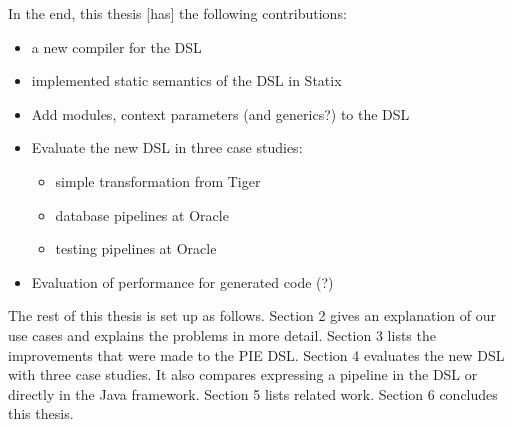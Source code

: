 In the end, this thesis [has]  the following contributions:
\begin{itemize}
  \item a new compiler for the DSL
  \item implemented static semantics of the \ac{DSL} in Statix
  \item Add modules, context parameters (and generics?) to the DSL
  \item Evaluate the new \ac{DSL} in three case studies:
  \begin{itemize}
    \item simple transformation from Tiger
    \item database pipelines at Oracle
    \item testing pipelines at Oracle
  \end{itemize}
  \item Evaluation of performance for generated code (?)
\end{itemize}

The rest of this thesis is set up as follows.
Section 2 gives an explanation of our use cases and explains the problems in more detail.
Section 3 lists the improvements that were made to the \ac{PIE} \ac{DSL}.
Section 4 evaluates the new \ac{DSL} with three case studies.
It also compares expressing a pipeline in the \ac{DSL} or directly in the Java framework.
Section 5 lists related work. 
Section 6 concludes this thesis.
